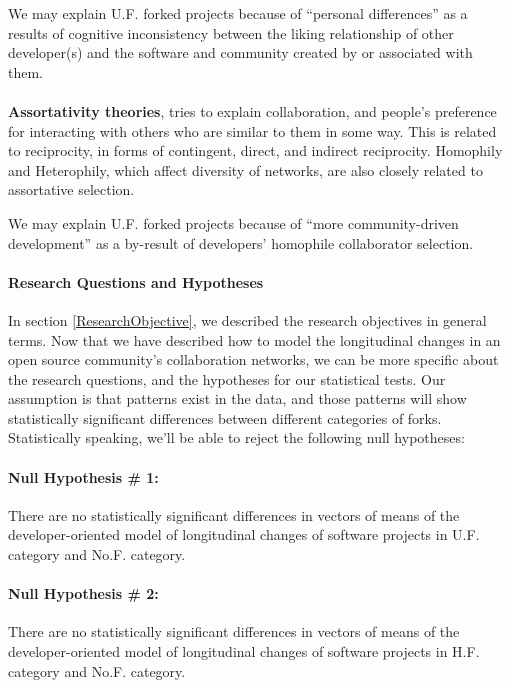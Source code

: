 \documentclass[12pt]{report}
\begin{document}
We may explain U.F. forked projects because of ``personal differences'' as a results of cognitive inconsistency between the liking relationship of other developer(s) and the software and community created by or associated with them. 

\paragraph{} \textbf{Assortativity theories}, tries to explain collaboration, and people's preference for interacting with others who are similar to them in some way. This is related to reciprocity, in forms of contingent, direct, and indirect reciprocity. Homophily and Heterophily, which affect diversity of networks, are also closely related to assortative selection.

We may explain U.F. forked projects because of ``more community-driven development'' as a by-result of developers' homophile collaborator selection.


\paragraph*{Research Questions and Hypotheses}
\label{RQs}
In section \ref{ResearchObjective}, we described the research objectives in general terms. Now that we have described how to model the longitudinal changes in an open source community's collaboration networks, we can be more specific about the research questions, and the hypotheses for our statistical tests. Our assumption is that patterns exist in the data, and those patterns will show statistically significant differences between different categories of forks. Statistically speaking, we'll be able to reject the following null hypotheses:

\paragraph*{Null Hypothesis \# 1:} 
\hspace{10 mm} There are no statistically significant differences in vectors of means of the developer-oriented model of longitudinal changes of software projects in U.F. category and No.F. category.

\paragraph*{Null Hypothesis \# 2:} 
\hspace{10 mm} There are no statistically significant differences in vectors of means of the developer-oriented model of longitudinal changes of software projects in H.F. category and No.F. category.
\end{document}

